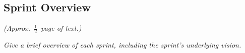 
\subsection{Sprint Overview}

\emph{(Approx.~$\frac{1}{2}$~page of text.)}

\emph{Give a brief overview of each sprint, including the sprint's underlying vision.}
